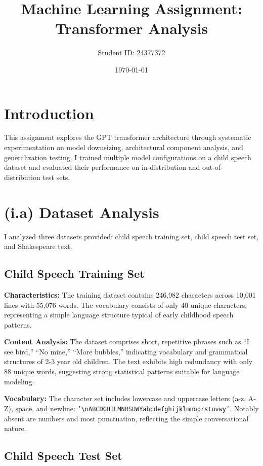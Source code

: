 \documentclass[11pt]{article}
\title{Machine Learning Assignment: Transformer Analysis}
\author{Student ID: 24377372}
\date{\today}
\begin{document}
\maketitle

\section*{Introduction}

This assignment explores the GPT transformer architecture through systematic experimentation on model downsizing, architectural component analysis, and generalization testing. I trained multiple model configurations on a child speech dataset and evaluated their performance on in-distribution and out-of-distribution test sets.

\section*{(i.a) Dataset Analysis}

I analyzed three datasets provided: child speech training set, child speech test set, and Shakespeare text.

\subsection*{Child Speech Training Set}

\textbf{Characteristics:} The training dataset contains 246,982 characters across 10,001 lines with 55,076 words. The vocabulary consists of only 40 unique characters, representing a simple language structure typical of early childhood speech patterns.

\textbf{Content Analysis:} The dataset comprises short, repetitive phrases such as ``I see bird,'' ``No mine,'' ``More bubbles,'' indicating vocabulary and grammatical structures of 2-3 year old children. The text exhibits high redundancy with only 88 unique words, suggesting strong statistical patterns suitable for language modeling.

\textbf{Vocabulary:} The character set includes lowercase and uppercase letters (a-z, A-Z), space, and newline: \texttt{'\textbackslash nABCDGHILMNRSUWYabcdefghijklmnoprstuvwy'}. Notably absent are numbers and most punctuation, reflecting the simple conversational nature.

\subsection*{Child Speech Test Set}
\end{document}
